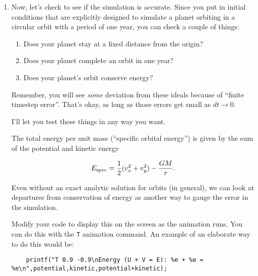 \documentclass[12pt]{article}
\begin{document}
\begin{enumerate}
\begin{itemize}
%

      \end{itemize}

      \item{Now, let's check to see if the simulation is accurate. Since you put in initial conditions that are explicitly designed to simulate a planet orbiting in a circular
	orbit with a period of one year, you can check a couple of things:

	  \begin{enumerate}
	\item Does your planet stay at a fixed distance from the origin?
	  \item Does your planet complete an orbit in one year?
	  \item Does your planet's orbit conserve energy?
	  \end{enumerate}

	Remember, you will see {\it some} deviation from these ideals because of ``finite timestep error''. That's okay, as long as those errors get small as $dt \rightarrow 0$.

	  I'll let you test these things in any way you want.

	  The total energy per unit mass (``specific orbital energy'') is given by the sum of the potential and kinetic energy

	  \begin{equation}
	E_{\rm spec}=\frac{1}{2}(v_x^2+v_y^2) - \frac{GM}{r}.
	  \end{equation}

	Even without an exact analytic solution for orbits (in general), we can look at departures from conservation of 
	  energy as another way to gauge the error in the simulation. 

	  Modify your code to display this on the screen as the animation runs. You can do this with the {\tt T} animation command. An example of an elaborate way to do this 
	  would be:

	  \begin{verbatim}
	printf("T 0.9 -0.9\nEnergy (U + V = E): %e + %e = %e\n",potential,kinetic,potential+kinetic);
	\end{verbatim}

}
\end{enumerate}
\end{document}
